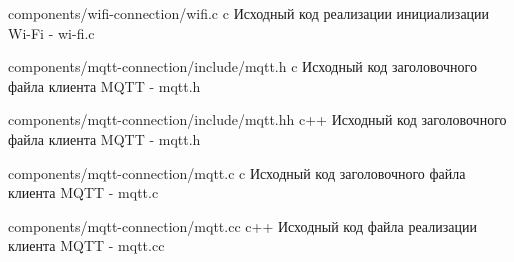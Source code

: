 \documentclass{bmstu}
\begin{document}
\begin{appendices}
        {components/wifi-connection/wifi.c} %
        {c}
        {Исходный код реализации инициализации Wi-Fi - wi-fi.c} %


        {components/mqtt-connection/include/mqtt.h} %
        {c}
        {Исходный код заголовочного файла клиента MQTT - mqtt.h} %

        {components/mqtt-connection/include/mqtt.hh} %
        {c++}
        {Исходный код заголовочного файла клиента MQTT - mqtt.h} %


        {components/mqtt-connection/mqtt.c} %
        {c}
        {Исходный код заголовочного файла клиента MQTT - mqtt.c} %

        {components/mqtt-connection/mqtt.cc} %
        {c++}
        {Исходный код файла реализации клиента MQTT - mqtt.cc} %
    \end{appendices}
\end{document}
